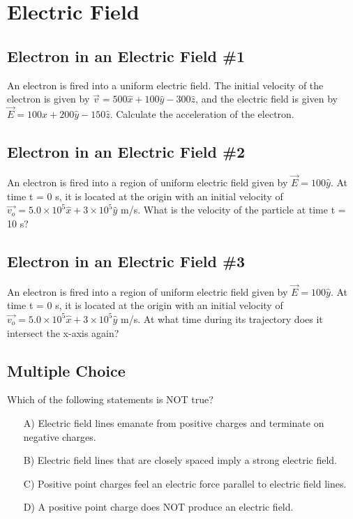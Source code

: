 \documentclass[11pt]{article}
\begin{document}
\pagebreak
\section{Electric Field}
\vspace{10pt}

\subsection{Electron in an Electric Field \#1}
An electron is fired into a uniform electric field.  The initial velocity of the electron is given by $\vec{v} = 500 \hat{x} + 100 \hat{y} - 300 \hat{z}$, and the electric field is given by $\vec{E} = 100 \hat{x} + 200 \hat{y} - 150 \hat{z}$.  Calculate the acceleration of the electron.

\subsection{Electron in an Electric Field \#2}
An electron is fired into a region of uniform electric field given by $\vec{E} = 100\hat{y}$. At time t = 0 s, it is located at the origin with an initial velocity of $\vec{v_o} = 5.0 \times 10^5 \hat{x} + 3 \times 10^5 \hat{y}$  m/s.  What is the velocity of the particle at time t = 10 s?

\subsection{Electron in an Electric Field \#3}
An electron is fired into a region of uniform electric field given by $\vec{E} = 100\hat{y}$. At time t = 0 s, it is located at the origin with an initial velocity of $\vec{v_o} = 5.0 \times 10^5 \hat{x} + 3 \times 10^5 \hat{y}$ m/s.  At what time during its trajectory does it intersect the x-axis again?

\subsection{Multiple Choice}
Which of the following statements is NOT true?

\begin{itemize}
	\item[A)] Electric field lines emanate from positive charges and terminate on negative charges.
	\item[B)] Electric field lines that are closely spaced imply a strong electric field.
	\item[C)] Positive point charges feel an electric force parallel to electric field lines.
	\item[D)] A positive point charge does NOT produce an electric field.
\end{itemize}
\end{document}
